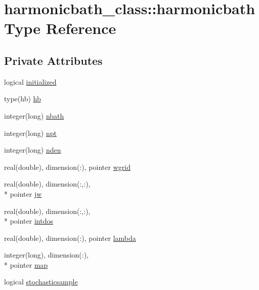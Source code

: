\hypertarget{structharmonicbath__class_1_1harmonicbath}{\section{harmonicbath\+\_\+class\+:\+:harmonicbath Type Reference}
\label{structharmonicbath__class_1_1harmonicbath}
}
\subsection*{Private Attributes}
\begin{DoxyCompactItemize}
\item 
logical \hyperlink{structharmonicbath__class_1_1harmonicbath_a876fbdf98da8f3bfeb4b4e03b58d6f74}{initialized}
\item 
type(hb) \hyperlink{structharmonicbath__class_1_1harmonicbath_a7b59e71a4b2100f821d091a5193d50f5}{hb}
\item 
integer(long) \hyperlink{structharmonicbath__class_1_1harmonicbath_ad55e02fae968c36f82bcfa4faf61d978}{nbath}
\item 
integer(long) \hyperlink{structharmonicbath__class_1_1harmonicbath_ab292a58613813f3ee812f949f9899089}{npt}
\item 
integer(long) \hyperlink{structharmonicbath__class_1_1harmonicbath_a87afd4834fce3bda38f7c49ecb203121}{nden}
\item 
real(double), dimension(\+:), pointer \hyperlink{structharmonicbath__class_1_1harmonicbath_a4268e843792e21ac9c78224a9e540e1f}{wgrid}
\item 
real(double), dimension(\+:,\+:), \\*
pointer \hyperlink{structharmonicbath__class_1_1harmonicbath_a5d4365532fe5feb53eb8bf06a64c8bcc}{jw}
\item 
real(double), dimension(\+:,\+:), \\*
pointer \hyperlink{structharmonicbath__class_1_1harmonicbath_aded5880e44b831dddae5be30966594e4}{intdos}
\item 
real(double), dimension(\+:), pointer \hyperlink{structharmonicbath__class_1_1harmonicbath_abdcf7e97525bd1bd424af202df2c5253}{lambda}
\item 
integer(long), dimension(\+:), \\*
pointer \hyperlink{structharmonicbath__class_1_1harmonicbath_a080d6ce6fdb6481bb8851b4fbc24a995}{map}
\item 
logical \hyperlink{structharmonicbath__class_1_1harmonicbath_a1ae24e6ddcc5e0a0b80decc16a0865cb}{stochasticsample}
\end{DoxyCompactItemize}



